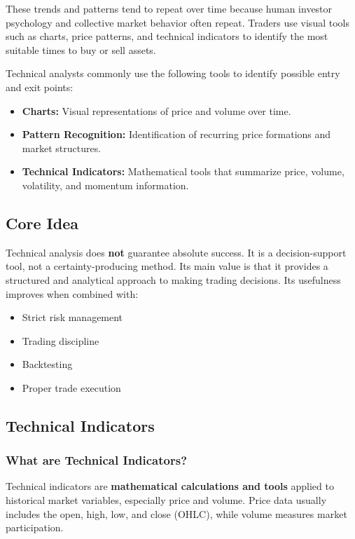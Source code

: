 \documentclass[12pt,openany]{book}
\begin{document}
These trends and patterns tend to repeat over time because human investor psychology and collective market behavior often repeat. Traders use visual tools such as charts, price patterns, and technical indicators to identify the most suitable times to buy or sell assets.

Technical analysts commonly use the following tools to identify possible entry and exit points:

\begin{itemize}[leftmargin=*]
    \item \textbf{Charts:} Visual representations of price and volume over time.
    \item \textbf{Pattern Recognition:} Identification of recurring price formations and market structures.
    \item \textbf{Technical Indicators:} Mathematical tools that summarize price, volume, volatility, and momentum information.
\end{itemize}

\subsection{Core Idea}
Technical analysis does \textbf{not} guarantee absolute success. It is a decision-support tool, not a certainty-producing method. Its main value is that it provides a structured and analytical approach to making trading decisions. Its usefulness improves when combined with:

\begin{itemize}[leftmargin=*]
    \item Strict risk management
    \item Trading discipline
    \item Backtesting
    \item Proper trade execution
\end{itemize}

\subsection{Technical Indicators}

\subsubsection{What are Technical Indicators?}
Technical indicators are \textbf{mathematical calculations and tools} applied to historical market variables, especially price and volume. Price data usually includes the open, high, low, and close (OHLC), while volume measures market participation.
\end{document}
